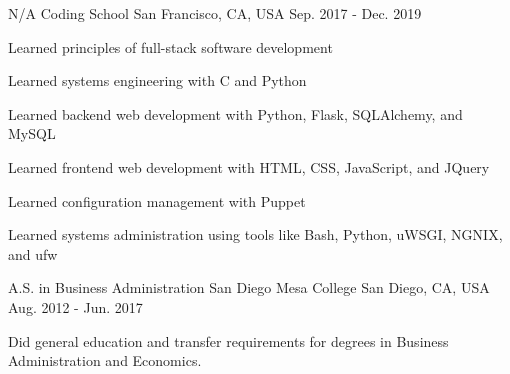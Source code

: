 

\begin{cventries}

	\cventry
	{N/A} %
	{Coding School} %
	{San Francisco, CA, USA} %
	{Sep. 2017 - Dec. 2019} %
	{
		\begin{cvitems} %
			\item {Learned principles of full-stack software development}
			\item {Learned systems engineering with C and Python}
			\item {Learned backend web development with Python, Flask, SQLAlchemy, and MySQL}
			\item {Learned frontend web development with HTML, CSS, JavaScript, and JQuery}
			\item {Learned configuration management with Puppet}
			\item {Learned systems administration using tools like Bash, Python, uWSGI, NGNIX, and ufw}
		\end{cvitems}
	}

	\cventry
	{A.S. in Business Administration} %
	{San Diego Mesa College} %
	{San Diego, CA, USA} %
	{Aug. 2012 - Jun. 2017} %
	{
		\begin{cvitems} %
			\item {Did general education and transfer requirements for degrees in Business Administration and Economics.}
		\end{cvitems}
	}

\end{cventries}
